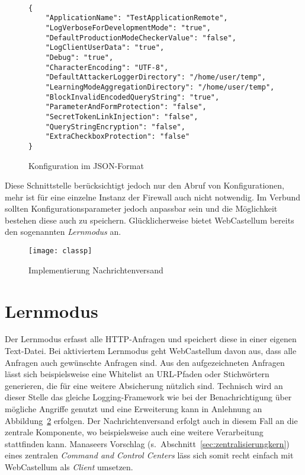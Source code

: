 \begin{figure}[h]
  \centering
  \begin{lstlisting}

{
    "ApplicationName": "TestApplicationRemote",
    "LogVerboseForDevelopmentMode": "true",
    "DefaultProductionModeCheckerValue": "false",
    "LogClientUserData": "true",
    "Debug": "true",
    "CharacterEncoding": "UTF-8",
    "DefaultAttackerLoggerDirectory": "/home/user/temp",
    "LearningModeAggregationDirectory": "/home/user/temp",
    "BlockInvalidEncodedQueryString": "true",
    "ParameterAndFormProtection": "false",
    "SecretTokenLinkInjection": "false",
    "QueryStringEncryption": "false",
    "ExtraCheckboxProtection": "false"    
}
\end{lstlisting}
\caption{Konfiguration im JSON-Format}
\medskip
\small
\label{fig:confjson}

\end{figure}

Diese Schnittstelle berücksichtigt jedoch nur den Abruf von Konfigurationen, mehr ist für eine einzelne Instanz der Firewall auch nicht notwendig. Im Verbund sollten Konfigurationsparameter jedoch anpassbar sein und die Möglichkeit bestehen diese auch zu speichern. Glücklicherweise bietet WebCastellum bereits den sogenannten \glqq\emph{Lernmodus}\grqq{} an.  



\begin{figure}[h]
  \begin{center}
    \texttt{[image: classp]}
    \caption{Implementierung Nachrichtenversand}
    \label{fig.impversand}
  \end{center}
\end{figure}

\section{Lernmodus}
\label{sec:lernmodus}
Der Lernmodus erfasst alle HTTP-Anfragen und speichert diese in einer eigenen Text-Datei. Bei aktiviertem Lernmodus geht WebCastellum davon aus, dass alle Anfragen auch gewünschte Anfragen sind. Aus den aufgezeichneten Anfragen lässt sich beispielsweise eine Whitelist an URL-Pfaden oder Stichwörtern generieren, die für eine weitere Absicherung nützlich sind. Technisch wird an dieser Stelle das gleiche Logging-Framework wie bei der Benachrichtigung über mögliche Angriffe genutzt und eine Erweiterung kann in Anlehnung an Abbildung~\ref{fig.impversand} erfolgen. Der Nachrichtenversand erfolgt auch in diesem Fall an die zentrale Komponente, wo beispielsweise auch eine weitere Verarbeitung stattfinden kann. Manaseers Vorschlag (s.~Abschnitt~\ref{sec:zentralisierungkern}) eines zentralen \glqq\emph{Command and Control Centers}\grqq{} läss sich somit recht einfach mit WebCastellum als \emph{Client} umsetzen.


